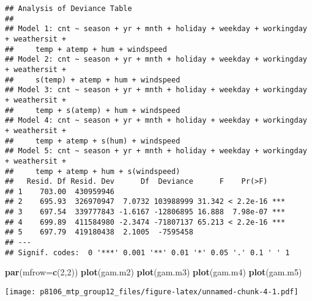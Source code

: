 \documentclass[]{article}
\newenvironment{Shaded}{\begin{snugshade}}{\end{snugshade}}
\newcommand{\KeywordTok}[1]{\textcolor[rgb]{0.13,0.29,0.53}{\textbf{#1}}}
\newcommand{\DataTypeTok}[1]{\textcolor[rgb]{0.13,0.29,0.53}{#1}}
\newcommand{\DecValTok}[1]{\textcolor[rgb]{0.00,0.00,0.81}{#1}}
\newcommand{\NormalTok}[1]{#1}
\begin{document}
\begin{verbatim}
## Analysis of Deviance Table
## 
## Model 1: cnt ~ season + yr + mnth + holiday + weekday + workingday + weathersit + 
##     temp + atemp + hum + windspeed
## Model 2: cnt ~ season + yr + mnth + holiday + weekday + workingday + weathersit + 
##     s(temp) + atemp + hum + windspeed
## Model 3: cnt ~ season + yr + mnth + holiday + weekday + workingday + weathersit + 
##     temp + s(atemp) + hum + windspeed
## Model 4: cnt ~ season + yr + mnth + holiday + weekday + workingday + weathersit + 
##     temp + atemp + s(hum) + windspeed
## Model 5: cnt ~ season + yr + mnth + holiday + weekday + workingday + weathersit + 
##     temp + atemp + hum + s(windspeed)
##   Resid. Df Resid. Dev      Df  Deviance      F    Pr(>F)    
## 1    703.00  430959946                                       
## 2    695.93  326970947  7.0732 103988999 31.342 < 2.2e-16 ***
## 3    697.54  339777843 -1.6167 -12806895 16.888  7.98e-07 ***
## 4    699.89  411584980 -2.3474 -71807137 65.213 < 2.2e-16 ***
## 5    697.79  419180438  2.1005  -7595458                     
## ---
## Signif. codes:  0 '***' 0.001 '**' 0.01 '*' 0.05 '.' 0.1 ' ' 1
\end{verbatim}

\begin{Shaded}
\begin{Highlighting}[]
\KeywordTok{par}\NormalTok{(}\DataTypeTok{mfrow=}\KeywordTok{c}\NormalTok{(}\DecValTok{2}\NormalTok{,}\DecValTok{2}\NormalTok{))}
\KeywordTok{plot}\NormalTok{(gam.m2)}
\KeywordTok{plot}\NormalTok{(gam.m3)}
\KeywordTok{plot}\NormalTok{(gam.m4)}
\KeywordTok{plot}\NormalTok{(gam.m5)}
\end{Highlighting}
\end{Shaded}

\texttt{[image: p8106\_mtp\_group12\_files/figure-latex/unnamed-chunk-4-1.pdf]}
\end{document}
